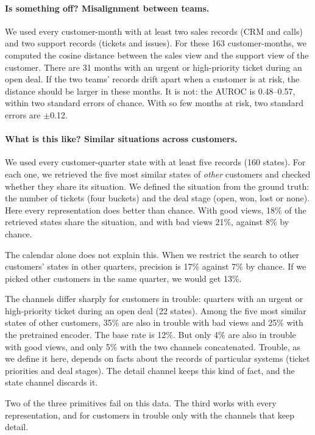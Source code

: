 \documentclass[11pt]{article}
\begin{document}
\paragraph{Is something off? Misalignment between teams.} We used every customer-month with at least two sales records (CRM and calls) and two support records (tickets and issues). For these 163 customer-months, we computed the cosine distance between the sales view and the support view of the customer. There are 31 months with an urgent or high-priority ticket during an open deal. If the two teams' records drift apart when a customer is at risk, the distance should be larger in these months. It is not: the AUROC is 0.48--0.57, within two standard errors of chance. With so few months at risk, two standard errors are $\pm$0.12.

\paragraph{What is this like? Similar situations across customers.} We used every customer-quarter state with at least five records (160 states). For each one, we retrieved the five most similar states of \emph{other} customers and checked whether they share its situation. We defined the situation from the ground truth: the number of tickets (four buckets) and the deal stage (open, won, lost or none). Here every representation does better than chance. With good views, 18\% of the retrieved states share the situation, and with bad views 21\%, against 8\% by chance.

The calendar alone does not explain this. When we restrict the search to other customers' states in other quarters, precision is 17\% against 7\% by chance. If we picked other customers in the same quarter, we would get 13\%.

The channels differ sharply for customers in trouble: quarters with an urgent or high-priority ticket during an open deal (22 states). Among the five most similar states of other customers, 35\% are also in trouble with bad views and 25\% with the pretrained encoder. The base rate is 12\%. But only 4\% are also in trouble with good views, and only 5\% with the two channels concatenated. Trouble, as we define it here, depends on facts about the records of particular systems (ticket priorities and deal stages). The detail channel keeps this kind of fact, and the state channel discards it.

Two of the three primitives fail on this data. The third works with every representation, and for customers in trouble only with the channels that keep detail.
\end{document}
